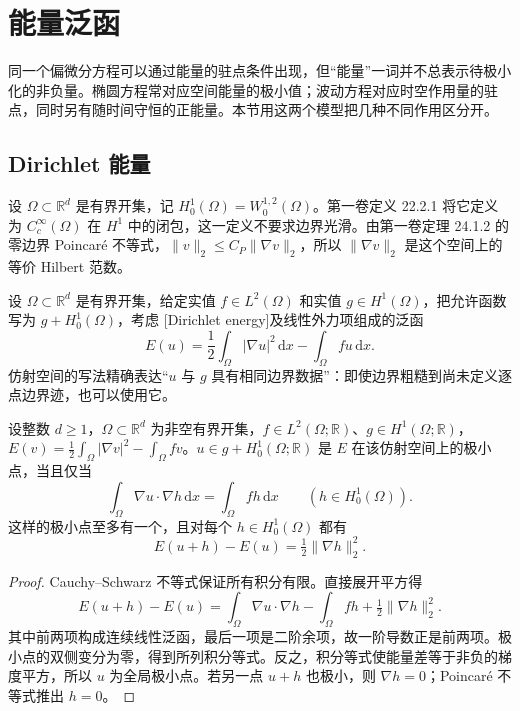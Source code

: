 \section{能量泛函}
\label{b2:sec:1403}

同一个偏微分方程可以通过能量的驻点条件出现，但“能量”一词并不总表示待极小化的非负量。椭圆方程常对应空间能量的极小值；波动方程对应时空作用量的驻点，同时另有随时间守恒的正能量。本节用这两个模型把几种不同作用区分开。

\subsection{Dirichlet 能量}
\label{b2:subsec:140301}

设 \(\Omega\subset\mathbb R^d\) 是有界开集，记 \(H_0^1(\Omega)=W_0^{1,2}(\Omega)\)。第一卷定义 22.2.1 将它定义为 \(C_c^\infty(\Omega)\) 在 \(H^1\) 中的闭包，这一定义不要求边界光滑。由第一卷定理 24.1.2 的零边界 Poincaré 不等式，\(\lVert v\rVert_2\le C_P\lVert\nabla v\rVert_2\)，所以 \(\lVert\nabla v\rVert_2\) 是这个空间上的等价 Hilbert 范数。

\ProseParagraphBreak

设 \(\Omega\subset\mathbb R^d\) 是有界开集，给定实值 \(f\in L^2(\Omega)\) 和实值 \(g\in H^1(\Omega)\)，把允许函数写为 \(g+H_0^1(\Omega)\)，考虑 [Dirichlet energy]及线性外力项组成的泛函
\[
 E(u)=\frac12\int_\Omega|\nabla u|^2\,\mathrm dx-\int_\Omega fu\,\mathrm dx.
\]
仿射空间的写法精确表达“\(u\) 与 \(g\) 具有相同边界数据”：即使边界粗糙到尚未定义逐点边界迹，也可以使用它。

\begin{proposition}[二次能量的驻点与极小点]
\label{b2:prop:14-dirichlet-minimum}
设整数 \(d\geq1\)，\(\Omega\subset\mathbb R^d\) 为非空有界开集，\(f\in L^2(\Omega;\mathbb R)\)、\(g\in H^1(\Omega;\mathbb R)\)，\(E(v)=\frac12\int_\Omega|\nabla v|^2-\int_\Omega fv\)。\(u\in g+H_0^1(\Omega;\mathbb R)\) 是 \(E\) 在该仿射空间上的极小点，当且仅当
\[
 \int_\Omega\nabla u\cdot\nabla h\,\mathrm dx=\int_\Omega fh\,\mathrm dx
 \qquad(h\in H_0^1(\Omega)).
\]
这样的极小点至多有一个，且对每个 \(h\in H_0^1(\Omega)\) 都有
\[E(u+h)-E(u)=\tfrac12\lVert\nabla h\rVert_2^2.\]
\end{proposition}
\begin{proof}
Cauchy--Schwarz 不等式保证所有积分有限。直接展开平方得
\[
 E(u+h)-E(u)=\int_\Omega\nabla u\cdot\nabla h-\int_\Omega fh
              +\tfrac12\lVert\nabla h\rVert_2^2.
\]
其中前两项构成连续线性泛函，最后一项是二阶余项，故一阶导数正是前两项。极小点的双侧变分为零，得到所列积分等式。反之，积分等式使能量差等于非负的梯度平方，所以 \(u\) 为全局极小点。若另一点 \(u+h\) 也极小，则 \(\nabla h=0\)；Poincaré 不等式推出 \(h=0\)。
\end{proof}

